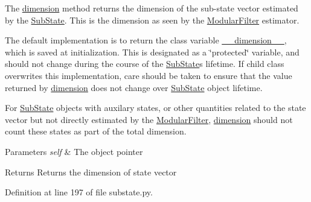 The \hyperlink{classmodest_1_1substates_1_1substate_1_1SubState_ab9027f6d1d7d57c47731612f519b7ee6}{dimension} method returns the dimension of the sub-\/state vector estimated by the \hyperlink{classmodest_1_1substates_1_1substate_1_1SubState}{Sub\+State}. This is the dimension as seen by the \hyperlink{namespacemodest_1_1ModularFilter}{Modular\+Filter} estimator.

The default implementation is to return the class variable \hyperlink{classmodest_1_1substates_1_1substate_1_1SubState_a5b1c0756a69da7f293a415c7d2d77843}{\+\_\+\+\_\+dimension\+\_\+\+\_\+}, which is saved at initialization. This is designated as a \char`\"{}protected\char`\"{} variable, and should not change during the course of the \hyperlink{classmodest_1_1substates_1_1substate_1_1SubState}{Sub\+State}\textquotesingle{}s lifetime. If child class overwrites this implementation, care should be taken to ensure that the value returned by \hyperlink{classmodest_1_1substates_1_1substate_1_1SubState_ab9027f6d1d7d57c47731612f519b7ee6}{dimension} does not change over \hyperlink{classmodest_1_1substates_1_1substate_1_1SubState}{Sub\+State} object lifetime.

For \hyperlink{classmodest_1_1substates_1_1substate_1_1SubState}{Sub\+State} objects with auxilary states, or other quantities related to the state vector but not directly estimated by the \hyperlink{namespacemodest_1_1ModularFilter}{Modular\+Filter}, \hyperlink{classmodest_1_1substates_1_1substate_1_1SubState_ab9027f6d1d7d57c47731612f519b7ee6}{dimension} should not count these states as part of the total dimension.


\begin{DoxyParams}{Parameters}
{\em self} & The object pointer\\
\hline
\end{DoxyParams}
\begin{DoxyReturn}{Returns}
Returns the dimension of state vector 
\end{DoxyReturn}


Definition at line 197 of file substate.\+py.

